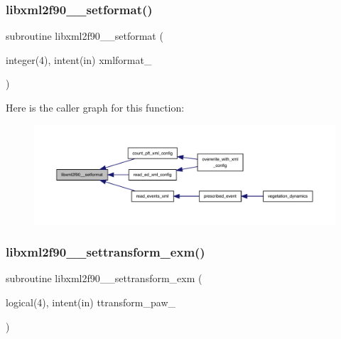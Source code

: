 \mbox{\label{libxml2f90_8f90__pp_8f90_a2b331dda347708a2db3459b365b848dc}} 
\subsubsection{\texorpdfstring{libxml2f90\+\_\+\+\_\+setformat()}{libxml2f90\_\_setformat()}}
{\footnotesize\ttfamily subroutine libxml2f90\+\_\+\+\_\+setformat (\begin{DoxyParamCaption}\item[{integer(4), intent(in)}]{xmlformat\+\_\+ }\end{DoxyParamCaption})}

Here is the caller graph for this function\+:
\nopagebreak
\begin{figure}[H]
\begin{center}
\leavevmode
\includegraphics[width=350pt]{libxml2f90_8f90__pp_8f90_a2b331dda347708a2db3459b365b848dc_icgraph}
\end{center}
\end{figure}
\mbox{\label{libxml2f90_8f90__pp_8f90_a2a5163c07b4567f5db11625bcdbb7607}} 
\subsubsection{\texorpdfstring{libxml2f90\+\_\+\+\_\+settransform\+\_\+exm()}{libxml2f90\_\_settransform\_exm()}}
{\footnotesize\ttfamily subroutine libxml2f90\+\_\+\+\_\+settransform\+\_\+exm (\begin{DoxyParamCaption}\item[{logical(4), intent(in)}]{ttransform\+\_\+paw\+\_\+ }\end{DoxyParamCaption})}


